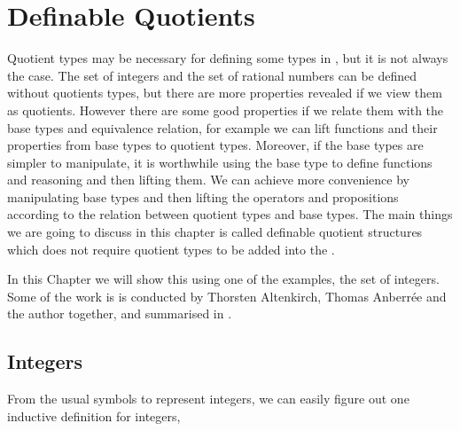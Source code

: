 \chapter{Definable Quotients}
\label{dq}


Quotient types may be necessary for defining some types in \itt, but
it is not always the case. The set of integers and the set of rational
numbers can be defined without quotients types, but there are more
properties revealed if we view them as quotients. 
However there are some good
properties if we relate them with the base types and equivalence
relation, for example we can lift functions and their properties from base types to
quotient types. Moreover, if the base types are simpler to manipulate,
it is worthwhile using the base type to define functions and reasoning
and then lifting them. We can achieve more convenience by manipulating base types and then lifting the operators and propositions according to the relation between quotient types and base types. The main things we
are going to discuss in this chapter is called  definable quotient
structures which does not require quotient types
to be added into the \itt.

In this Chapter we will show this using one of the examples, the set
of integers. Some of the work is is conducted by Thorsten Altenkirch,
Thomas Anberr\'{e}e and the author together, and summarised in \cite{aan} .


\section{Integers}

From the usual symbols to represent integers, we can easily figure out
one inductive definition for integers,

\begin{code}
\\
\>  \AgdaSymbol{:}  \<%
\\
\>[0]\<[2]%
\>[2]\AgdaInductiveConstructor{+\_} \AgdaSymbol{:}   \<%
\\
\>[0]\<[2]%
\>[2] \AgdaSymbol{:} \<%
\\
\>[0]\<[2]%
\>[2]\AgdaInductiveConstructor{-\_} \AgdaSymbol{:}   \<%
\\
\end{code}

